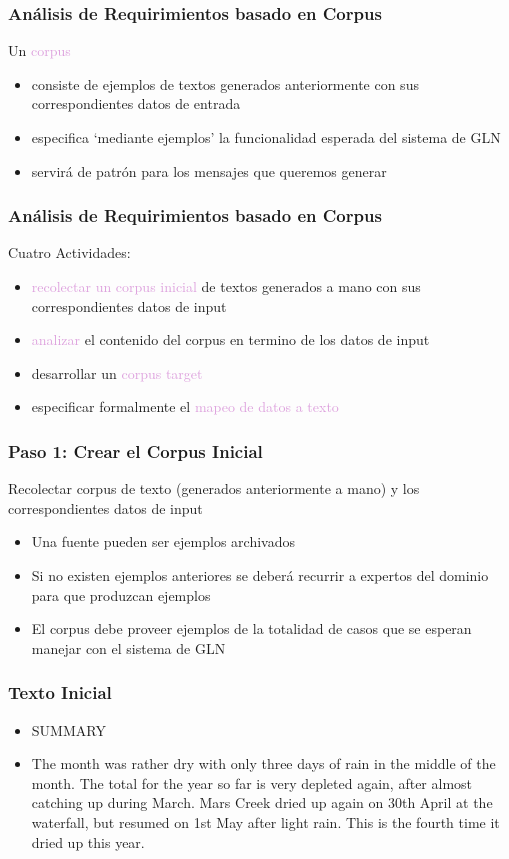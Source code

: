 \documentclass[compress,color=usenames]{beamer}
\newcommand{\mH}[1]{\textcolor{Plum}{#1}}
\begin{document}
\begin{frame}
\frametitle{An\'alisis de Requirimientos basado en Corpus}

Un \mH{corpus}
\begin{itemize}
\item consiste de ejemplos de textos generados anteriormente con sus correspondientes datos de entrada

\item especifica `mediante ejemplos' la funcionalidad esperada del sistema de GLN
\item servir\'a de patr\'on para los mensajes que queremos generar 
\end{itemize}

\end{frame}

\begin{frame}
\frametitle{An\'alisis de Requirimientos basado en Corpus}

 { {Cuatro Actividades:}}
\begin{itemize}
\item \mH{recolectar un corpus inicial} de textos generados a mano con sus correspondientes datos de input

\item \mH{analizar} el contenido del corpus en termino de los datos de input
\item desarrollar un \mH{corpus target}
\item especificar formalmente el \mH{mapeo de datos a texto} 
\end{itemize}
\end{frame}

\begin{frame}
\frametitle{Paso 1: Crear el Corpus Inicial}

 Recolectar corpus de texto (generados anteriormente a mano) y los correspondientes datos de input
\begin{itemize}
\item Una fuente pueden ser ejemplos archivados 
\item Si no existen ejemplos anteriores se deber\'a recurrir a expertos del dominio para que produzcan ejemplos
\item El corpus debe proveer ejemplos de la totalidad de casos que se esperan manejar con el sistema de GLN
\end{itemize}

\end{frame}

\begin{frame}
\frametitle{Texto Inicial}

\begin{itemize}
\item { {SUMMARY}}
\item { {The month was rather dry with only three days of rain in the middle of the month. The total for the year so far is very depleted again, after almost catching up during March. Mars Creek dried up again on 30th April at the waterfall, but resumed on 1st May after light rain. This is the fourth time it dried up this year.}}
\end{itemize}

\end{frame}
\end{document}
